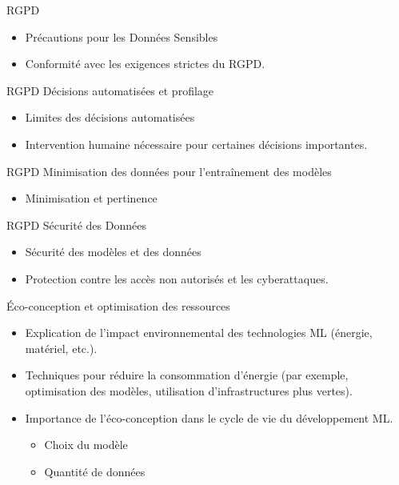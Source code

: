 \begin{frame}{RGPD}
  \begin{itemize}
  \item {Précautions pour les Données Sensibles}
    \item Conformité avec les exigences strictes du RGPD.
\end{itemize}
\end{frame}

\begin{frame}{RGPD}
  Décisions automatisées et profilage

  \begin{itemize}
  \item {Limites des décisions automatisées} 
  \item Intervention humaine nécessaire pour certaines décisions importantes.
  \end{itemize}
\end{frame}

\begin{frame}{RGPD}
  Minimisation des données pour l'entraînement des modèles

  \begin{itemize}
  \item {Minimisation et pertinence}
  \end{itemize}
\end{frame}

\begin{frame}{RGPD}
  Sécurité des Données

  \begin{itemize}
  \item {Sécurité des modèles et des données}
  \item Protection contre les accès non autorisés et les cyberattaques.
\end{itemize}
\end{frame}

\begin{frame}{Éco-conception et optimisation des ressources}
  \begin{itemize}
  \item Explication de l'impact environnemental des technologies ML
    (énergie, matériel, etc.).
  \item Techniques pour réduire la consommation d'énergie (par
    exemple, optimisation des modèles, utilisation d'infrastructures
    plus vertes).
  \item Importance de l'éco-conception dans le cycle de vie du
    développement ML.
    \begin{itemize}
    \item Choix du modèle
    \item Quantité de données
    \end{itemize}
  \end{itemize}
\end{frame}

